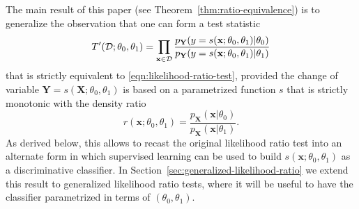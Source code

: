\documentclass[12pt]{article}
\numberwithin{equation}{section}
\theoremstyle{plain}
\begin{document}
%

The main result of this paper (see Theorem~\ref{thm:ratio-equivalence}) is to
generalize the observation that one can form a test statistic
\begin{equation}\label{eqn:likelihood-ratio-test-equiv}
T'({\cal D}; \theta_0, \theta_1) = \prod_{\mathbf{x} \in {\cal D}} \frac{ p_\mathbf{Y}(y=s(\mathbf{x}; \theta_0, \theta_1) | \theta_0)}{ p_\mathbf{Y}(y=s(\mathbf{x}; \theta_0, \theta_1) | \theta_1)}
\end{equation}
that is strictly equivalent to \ref{eqn:likelihood-ratio-test}, provided the change
of variable $\mathbf{Y} = s(\mathbf{X}; \theta_0, \theta_1)$ is based
on a parametrized function $s$ that is strictly monotonic with the density ratio
\begin{equation}
r(\mathbf{x};\theta_0, \theta_1) = \frac{p_\mathbf{X}(\mathbf{x}|\theta_0)}{p_\mathbf{X}(\mathbf{x}|\theta_1)}.
\end{equation}
As derived below, this allows to recast the original likelihood ratio test into
an alternate form in which supervised learning can be used to build
$s(\mathbf{x}; \theta_0, \theta_1)$ as a discriminative classifier.  In
Section~\ref{sec:generalized-likelihood-ratio} we extend this result to
generalized likelihood ratio tests, where it will be useful to have the
classifier  parametrized in terms of $(\theta_0, \theta_1)$.
\end{document}

